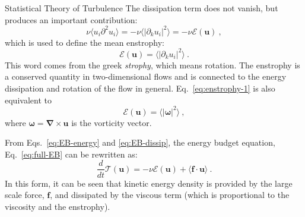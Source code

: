 \begin{chapter}{Statistical Theory of Turbulence}
The dissipation term does not vanish, but produces an important contribution:
\begin{equation} \label{eq:EB-dissip}
	\nu \big\langle u_i \partial^2 u_i \big\rangle =
	- \nu \big\langle \left\lvert\partial_k u_i\right\lvert^2 \big\rangle
	= - \nu \mathcal{E}(\mathbf{u}) \ ,
\end{equation}
which is used to define the mean enstrophy:
\begin{equation} \label{eq:enstrophy-1}
	\mathcal{E}(\mathbf{u}) = \big\langle |\partial_k u_i|^2 \big\rangle \ .
\end{equation}
This word comes from the greek \textit{strophy}, which means rotation.
The enstrophy is a conserved quantity in two-dimensional flows and
is connected to the energy dissipation and rotation of the flow in general.
Eq.~\eqref{eq:enstrophy-1} is also equivalent to
\begin{equation}
	\mathcal{E}(\mathbf{u}) = \big\langle |\bm{\omega}|^2 \big\rangle \ ,
\end{equation}
where $\bm{\omega} = \mathbf{\nabla} \times \mathbf{u}$ is the vorticity vector.

From Eqs.~\eqref{eq:EB-energy} and \eqref{eq:EB-dissip}, the energy budget equation, Eq.~\eqref{eq:full-EB} can be rewritten as:
\begin{equation} \label{eq:EB}
	\frac{d}{dt} \mathcal{T}(\mathbf{u}) = - \nu \mathcal{E}(\mathbf{u})
	+ \big\langle \mathbf{f \cdot u} \big\rangle \ .
\end{equation}
In this form, it can be seen that kinetic energy density
is provided by the large scale force, $\bm{f}$, and dissipated by
the viscous term (which is proportional to the viscosity and the enstrophy).



\end{chapter}
